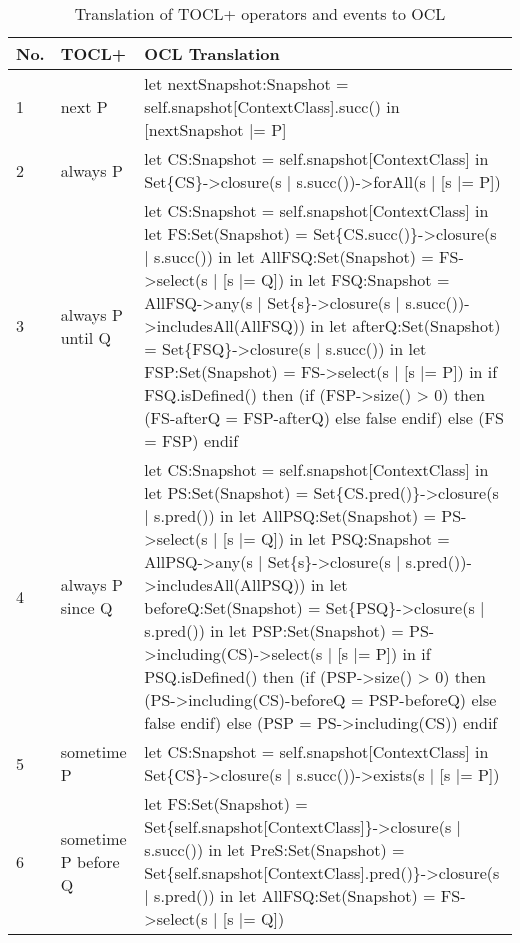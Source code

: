 \captionsetup{labelsep=space}
\begin{longtable}{|>{\footnotesize}p{0.6cm}|>{\scriptsize\raggedright\arraybackslash}p{4cm}|>{\scriptsize\raggedright\arraybackslash}p{\dimexpr\textwidth-4.6cm-4\tabcolsep-3\arrayrulewidth\relax}|}
    \caption{Translation of TOCL+ operators and events to OCL}
    \label{tab:TOCL2OCL} \\
    \hline
    \textbf{No.} & \textbf{TOCL+} & \textbf{OCL Translation} \\
    \hline
    1 & 
    next P &
    let nextSnapshot:Snapshot = self.snapshot[ContextClass].succ() in [nextSnapshot |= P] \\
    \hline
    2 &
    always P &
    let CS:Snapshot = self.snapshot[ContextClass] in Set\{CS\}->closure(s | s.succ())->forAll(s | [s |= P]) \\
    \hline  
    3 &
    always P until Q &
    let CS:Snapshot = self.snapshot[ContextClass]
    in let FS:Set(Snapshot) = Set\{CS.succ()\}->closure(s | s.succ())
    in let AllFSQ:Set(Snapshot) = FS->select(s | [s |= Q])
    in let FSQ:Snapshot = AllFSQ->any(s | Set\{s\}->closure(s | s.succ())->includesAll(AllFSQ))
    in let afterQ:Set(Snapshot) = Set\{FSQ\}->closure(s | s.succ())
    in let FSP:Set(Snapshot) = FS->select(s | [s |= P])
    in if FSQ.isDefined() then (if (FSP->size() > 0) then (FS-afterQ = FSP-afterQ) else false endif) else (FS = FSP) endif \\
    \hline
    4 &
    always P since Q &
    let CS:Snapshot = self.snapshot[ContextClass]
    in let PS:Set(Snapshot) = Set\{CS.pred()\}->closure(s | s.pred())
    in let AllPSQ:Set(Snapshot) = PS->select(s | [s |= Q])
    in let PSQ:Snapshot = AllPSQ->any(s | Set\{s\}->closure(s | s.pred())->includesAll(AllPSQ))
    in let beforeQ:Set(Snapshot) = Set\{PSQ\}->closure(s | s.pred())
    in let PSP:Set(Snapshot) = PS->including(CS)->select(s | [s |= P])
    in if PSQ.isDefined() then (if (PSP->size() > 0) then (PS->including(CS)-beforeQ = PSP-beforeQ) else false endif) else (PSP = PS->including(CS)) endif \\
    \hline
    5 &
    sometime P &
    let CS:Snapshot = self.snapshot[ContextClass] in Set\{CS\}->closure(s | s.succ())->exists(s | [s |= P]) \\
    \hline
    6 &
    sometime P before Q &
    let FS:Set(Snapshot) = Set\{self.snapshot[ContextClass]\}->closure(s | s.succ())
    in let PreS:Set(Snapshot) = Set\{self.snapshot[ContextClass].pred()\}->closure(s | s.pred())
    in let AllFSQ:Set(Snapshot) = FS->select(s | [s |= Q])

\end{longtable}
